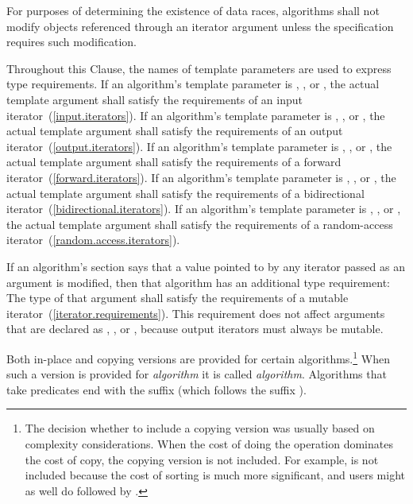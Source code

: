 \pnum
For purposes of determining the existence of data races, algorithms shall
not modify objects referenced through an iterator argument unless the
specification requires such modification.


\begin{removedblock}
\pnum
Throughout this Clause, the names of template parameters
are used to express type requirements.
If an algorithm's template parameter is
,
,
or
,
the actual template argument shall satisfy the
requirements of an input iterator~(\ref{input.iterators}).
If an algorithm's template parameter is
,
,
or
,
the actual template argument shall satisfy the requirements
of an output iterator~(\ref{output.iterators}).
If an algorithm's template parameter is
,
,
or
,
the actual template argument shall satisfy the requirements
of a forward iterator~(\ref{forward.iterators}).
If an algorithm's template parameter is
,
,
or
,
the actual template argument shall satisfy the requirements
of a bidirectional iterator~(\ref{bidirectional.iterators}).
If an algorithm's template parameter is
,
,
or
,
the actual template argument shall satisfy the requirements
of a random-access iterator~(\ref{random.access.iterators}).

\pnum
If an algorithm's
section says that a value pointed to by any iterator passed
as an argument is modified, then that algorithm has an additional
type requirement:
The type of that argument shall satisfy the requirements
of a mutable iterator~(\ref{iterator.requirements}).
\enternote
This requirement does not affect arguments that are declared as
,
,
or
,
because output iterators must always be mutable.
\exitnote
\end{removedblock}

\pnum
Both in-place and copying versions are provided for certain
algorithms.\footnote{The decision whether to include a copying version was
usually based on complexity considerations. When the cost of doing the operation
dominates the cost of copy, the copying version is not included. For example,
 is not included because the cost of sorting is much more
significant, and users might as well do  followed by .}
When such a version is provided for \textit{algorithm} it is called
\textit{algorithm}. Algorithms that take predicates end with the
suffix  (which follows the suffix ).

